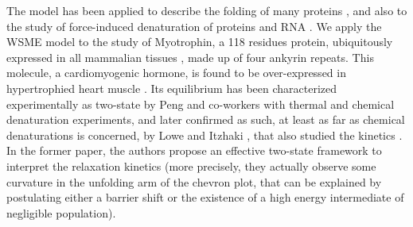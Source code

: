 The model has been applied to describe the folding of many proteins 
\cite{Zamparo2009,Cellmer2008,Itoh2008,Itoh2010,Abe2009,Morozov2007,
Chung2008,Bruscolini2007a,Bruscolini2007},
and also to the study of force-induced denaturation of proteins and RNA 
\cite{Imparato2007,Imparato2007a,Imparato2008,Imparato2009,Caraglio2010}. 
We apply the WSME model to the study of Myotrophin, a 118 residues protein, 
ubiquitously expressed in all mammalian tissues 
\cite{Sen1990,Taoka1994,Sivasubramanian1996,Anderson1999}, 
made up of four ankyrin repeats. 
This molecule, a cardiomyogenic hormone,  is found to be over-expressed in
hypertrophied heart muscle \cite{Mukherjee1993}.
Its equilibrium has been characterized 
experimentally as two-state  by Peng and co-workers\cite{Mosavi2002a}
with thermal and chemical denaturation experiments, and later confirmed 
as such, at least as far as chemical denaturations is concerned, 
by  Lowe and Itzhaki \cite{Lowe2007a}, that also studied the kinetics 
\cite{Lowe2007a,Lowe2007}. 
In the former paper, the authors propose an effective two-state framework 
to interpret the relaxation kinetics \cite{Lowe2007a} 
(more precisely, they actually observe some curvature in the unfolding arm 
of the chevron plot, that can be explained by postulating either a barrier 
shift or the existence of a high energy intermediate of negligible population).
